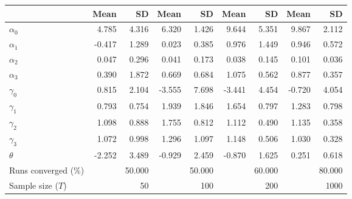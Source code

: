 
\begin{tabular}[t]{lrrrrrrrr}
\toprule
  & Mean & SD & Mean  & SD  & Mean   & SD   & Mean    & SD   \\
\midrule
$\alpha_{0}$ & 4.785 & 4.316 & 6.320 & 1.426 & 9.644 & 5.351 & 9.867 & 2.112\\
$\alpha_{1}$ & -0.417 & 1.289 & 0.023 & 0.385 & 0.976 & 1.449 & 0.946 & 0.572\\
$\alpha_{2}$ & 0.047 & 0.296 & 0.041 & 0.173 & 0.038 & 0.145 & 0.101 & 0.036\\
$\alpha_{3}$ & 0.390 & 1.872 & 0.669 & 0.684 & 1.075 & 0.562 & 0.877 & 0.357\\
$\gamma_{0}$ & 0.815 & 2.104 & -3.555 & 7.698 & -3.441 & 4.454 & -0.720 & 4.054\\
$\gamma_{1}$ & 0.793 & 0.754 & 1.939 & 1.846 & 1.654 & 0.797 & 1.283 & 0.798\\
$\gamma_{2}$ & 1.098 & 0.888 & 1.755 & 0.812 & 1.112 & 0.490 & 1.135 & 0.358\\
$\gamma_{3}$ & 1.072 & 0.998 & 1.296 & 1.097 & 1.148 & 0.506 & 1.030 & 0.328\\
$\theta$ & -2.252 & 3.489 & -0.929 & 2.459 & -0.870 & 1.625 & 0.251 & 0.618\\
Runs converged (\%) &  & 50.000 &  & 50.000 &  & 60.000 &  & 80.000\\
Sample size ($T$) &  & 50 &  & 100 &  & 200 &  & 1000\\
\bottomrule
\end{tabular}
